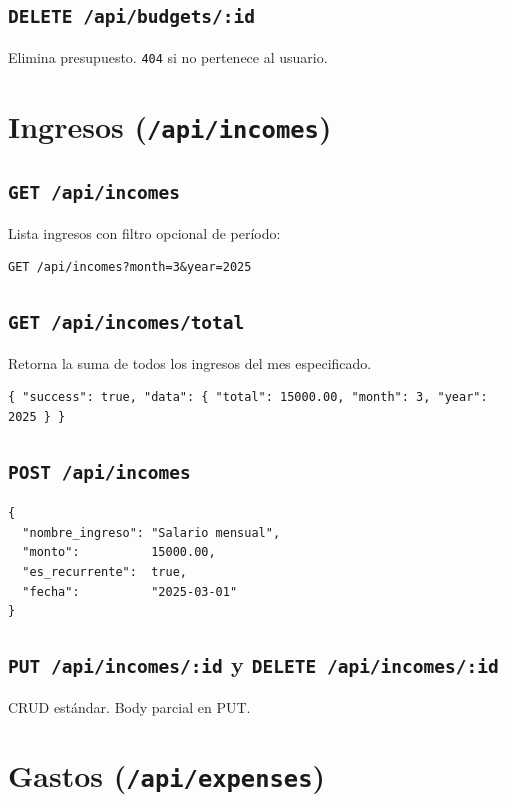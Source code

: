 \subsection{\texttt{DELETE /api/budgets/:id}} Elimina presupuesto. \texttt{404} si no pertenece al usuario.

\section{Ingresos (\texttt{/api/incomes})}

\subsection{\texttt{GET /api/incomes}}
Lista ingresos con filtro opcional de período:
\begin{lstlisting}[style=bash]
GET /api/incomes?month=3&year=2025
\end{lstlisting}

\subsection{\texttt{GET /api/incomes/total}}
Retorna la suma de todos los ingresos del mes especificado.
\begin{lstlisting}[style=json]
{ "success": true, "data": { "total": 15000.00, "month": 3, "year": 2025 } }
\end{lstlisting}

\subsection{\texttt{POST /api/incomes}}
\begin{lstlisting}[style=json]
{
  "nombre_ingreso": "Salario mensual",
  "monto":          15000.00,
  "es_recurrente":  true,
  "fecha":          "2025-03-01"
}
\end{lstlisting}

\subsection{\texttt{PUT /api/incomes/:id} y \texttt{DELETE /api/incomes/:id}} CRUD estándar. Body parcial en PUT.

\section{Gastos (\texttt{/api/expenses})}

